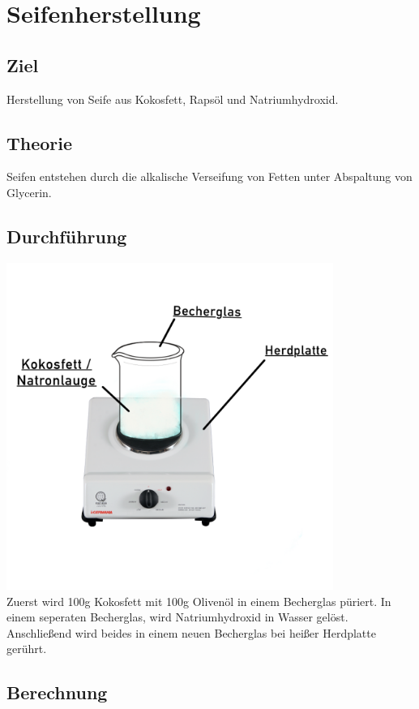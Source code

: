 \documentclass{article}
\begin{document}
    \newpage
    \section{Seifenherstellung}

    \subsection{Ziel}
    Herstellung von Seife aus Kokosfett, Rapsöl und Natriumhydroxid.

    \subsection{Theorie}
    Seifen entstehen durch die alkalische Verseifung von Fetten unter Abspaltung von Glycerin.

    \subsection{Durchführung}
    \includegraphics[width=0.8\textwidth]{Seife.png} \\
    Zuerst wird 100g Kokosfett mit 100g Olivenöl in einem Becherglas püriert.
    In einem seperaten Becherglas, wird Natriumhydroxid in Wasser gelöst.
    Anschließend wird beides in einem neuen Becherglas bei heißer Herdplatte gerührt.

    \subsection{Berechnung}
\end{document}
